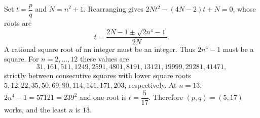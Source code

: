 Set $t=\dfrac{p}{q}$ and $N=n^2+1$. Rearranging gives $2Nt^2-(4N-2)t+N=0$, whose roots are
\[
t=\dfrac{2N-1\pm\sqrt{2n^4-1}}{2N}.
\]
A rational square root of an integer must be an integer. Thus $2n^4-1$ must be a square. For $n=2,\ldots,12$ these values are
\[
31,161,511,1249,2591,4801,8191,13121,19999,29281,41471,
\]
strictly between consecutive squares with lower square roots
$5,12,22,35,50,69,90,114,141,171,203$, respectively. At $n=13$, $2n^4-1=57121=239^2$ and one root is $t=\dfrac{5}{17}$. Therefore $(p,q)=(5,17)$ works, and the least $n$ is $\boxed{13}$.
